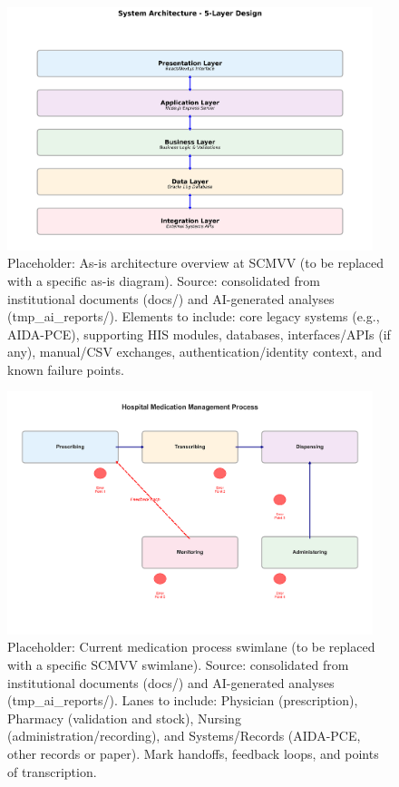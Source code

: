 \begin{figure}[htbp]
    \centering
    \includegraphics[width=0.95\textwidth]{images/generated/system_architecture.png}
    \caption{Placeholder: As-is architecture overview at SCMVV (to be replaced with a specific as-is diagram). Source: consolidated from institutional documents (docs/) and AI-generated analyses (tmp\_ai\_reports/). Elements to include: core legacy systems (e.g., AIDA-PCE), supporting HIS modules, databases, interfaces/APIs (if any), manual/CSV exchanges, authentication/identity context, and known failure points.}
    \label{fig:as_is_architecture_scmvv}
\end{figure}

\begin{figure}[htbp]
    \centering
    \includegraphics[width=0.95\textwidth]{images/generated/medication_flow_process.png}
    \caption{Placeholder: Current medication process swimlane (to be replaced with a specific SCMVV swimlane). Source: consolidated from institutional documents (docs/) and AI-generated analyses (tmp\_ai\_reports/). Lanes to include: Physician (prescription), Pharmacy (validation and stock), Nursing (administration/recording), and Systems/Records (AIDA-PCE, other records or paper). Mark handoffs, feedback loops, and points of transcription.}
    \label{fig:as_is_swimlane_scmvv}
\end{figure}